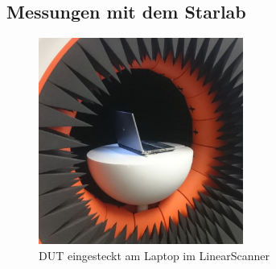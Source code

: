 \newpage
\subsection{Messungen mit dem Starlab}

\begin{figure}[h!]
	\centering
	\includegraphics[width=0.6\textwidth]{../fig/plt/LaptopimStarLab.JPG}
	\caption{DUT eingesteckt am Laptop im LinearScanner}
	\label{fig:LaptopimStarlab}
\end{figure}



